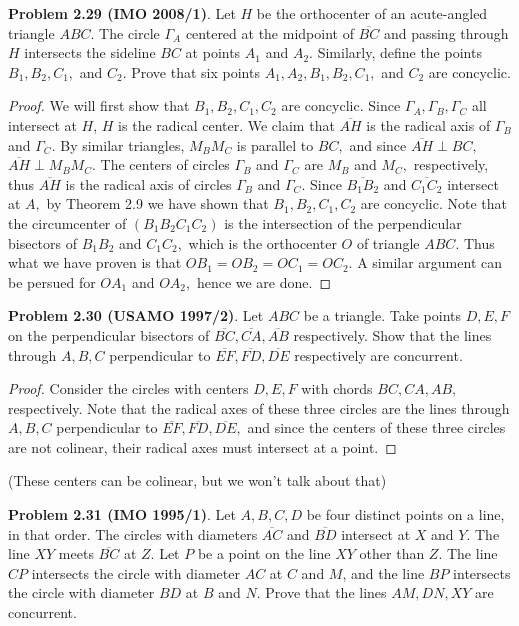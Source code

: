 \documentclass[letterpaper,oneside]{book}
\begin{document}
  

  \textbf{Problem 2.29 (IMO 2008/1)}.   Let $H$ be the orthocenter of an acute-angled triangle $ABC.$ The circle $\Gamma_A$ centered at the midpoint of $\overline{BC}$ and passing through $H$ intersects the sideline $BC$ at points $A_1$ and $A_2.$ Similarly, define the points $B_1, B_2, C_1,$ and $C_2.$ Prove that six points $A_1, A_2, B_1, B_2, C_1,$ and $C_2$ are concyclic.

  \begin{proof}  We will first show that $B_1, B_2, C_1, C_2$ are concyclic. Since $\Gamma_A,\Gamma_B, \Gamma_C$ all intersect at $H$, $H$ is the radical center. We claim that $\overline{AH}$ is the radical axis of $\Gamma_B$ and $\Gamma_C.$ By similar triangles, $M_BM_C$ is parallel to $BC,$ and since $\overline{AH} \perp BC,$ $\overline{AH} \perp M_BM_C.$ The centers of circles $\Gamma_B$ and $\Gamma_C$ are $M_B$ and $M_C,$ respectively, thus $\overline{AH}$ is the radical axis of circles $\Gamma_B$ and $\Gamma_C.$ Since $\overline{B_1B_2}$ and $\overline{C_1C_2}$ intersect at $A,$ by Theorem 2.9 we have shown that $B_1, B_2,C_1,C_2$ are concyclic. Note that the circumcenter of $(B_1B_2C_1C_2)$ is the intersection of the perpendicular bisectors of $B_1B_2$ and $C_1C_2,$ which is the orthocenter $O$ of triangle $ABC.$ Thus what we have proven is that $OB_1 = OB_2 = OC_1 = OC_2.$ A similar argument can be persued for $OA_1$ and $OA_2,$ hence we are done. \end{proof}

  

  \textbf{Problem 2.30 (USAMO 1997/2)}.   Let $ABC$ be a triangle. Take points $D, E, F$ on the perpendicular bisectors of $\overline{BC}, \overline{CA}, \overline{AB}$ respectively. Show that the lines through $A, B, C$  perpendicular to $\overline{EF}, \overline{FD}, \overline{DE}$ respectively are concurrent.

  \begin{proof}  Consider the circles with centers $D,E,F$ with chords $BC, CA, AB,$ respectively. Note that the radical axes of these three circles are the lines through $A,B,C$ perpendicular to $\overline{EF}, \overline{FD}, \overline{DE},$ and since the centers of these three circles are not colinear, their radical axes must intersect at a point. \end{proof} (These centers  can  be colinear, but we won't talk about that)

  

  \textbf{Problem 2.31 (IMO 1995/1)}.   Let  $A, B, C, D$ be four distinct points on a line, in that order. The circles with diameters $\overline{AC}$ and $\overline{BD}$ intersect at $X$ and $Y.$ The line $XY$ meets $\overline{BC}$ at $Z.$ Let $P$ be a point on the line $XY$ other than $Z$. The line $CP$ intersects the circle with diameter $AC$ at $C$ and $M$, and the line $BP$ intersects the circle with diameter $BD$ at $B$ and $N$. Prove that the lines $AM, DN, XY$ are concurrent.
\end{document}
